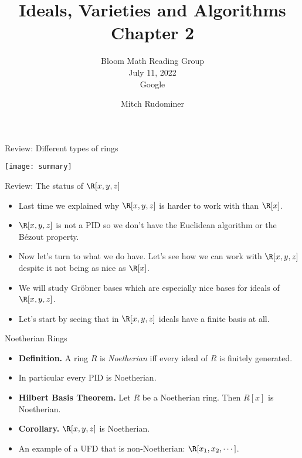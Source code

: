 \documentclass[handout]{beamer}
\title{Ideals, Varieties and Algorithms \\ Chapter 2}
\subtitle{Bloom Math Reading Group \\ July 11, 2022 \\ Google}
\author{Mitch Rudominer}
\date{}
\begin{document}
\begin{frame}
  \titlepage
\end{frame}




\begin{frame}{Review: Different types of rings}

\begin{center}
\texttt{[image: summary]}
\end{center}

\end{frame}



\begin{frame}{Review: The status of $\R[x,y,z]$}

\begin{itemize}
  \item Last time we explained why $\R[x,y,z]$ is harder to work with than $\R[x]$.
  \item $\R[x,y,z]$ is not a PID so we don't have the Euclidean algorithm or the B\'{e}zout property.
  \item Now let's turn to what we do have. Let's see how we can work with $\R[x,y,z]$ despite it not being as nice as $\R[x]$.
  \item We will study Gr\"{o}bner bases which are especially nice bases for ideals of $\R[x,y,z]$.
  \item Let's start by seeing that in $\R[x,y,z]$ ideals have a finite basis at all.
\end{itemize}

\end{frame}



\begin{frame}{Noetherian Rings}

\begin{itemize}
  \item \textbf{Definition.} A ring $R$ is \emph{Noetherian} iff every ideal of $R$ is finitely generated.
  \item In particular every PID is Noetherian.
  \item \textbf{Hilbert Basis Theorem.} Let $R$ be a Noetherian ring. Then $R[x]$ is Noetherian.
  \item \textbf{Corollary.} $\R[x,y,z]$ is Noetherian.
  \item An example of a UFD that is non-Noetherian: $\R[x_1, x_2, \cdots]$.
\end{itemize}

\end{frame}
\end{document}
